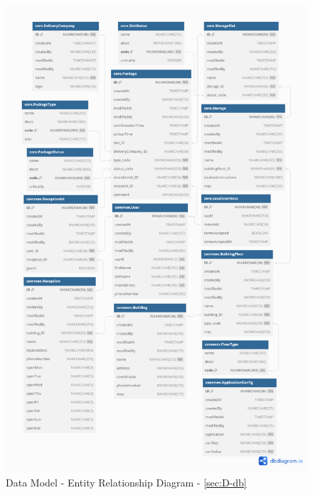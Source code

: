 \begin{figure}[!htb]
	\centering
	\includegraphics[width=1\linewidth]{images/DB/DB_Relationship.png}
	\caption{Data Model - Entity Relationship Diagram - \autoref{sec:D-db}}
	\label{fig:db}
\end{figure}
